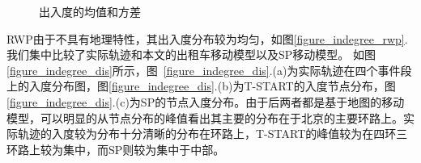 \begin{figure}[!h]
\centering
{}
\caption{出入度的均值和方差}\label{figure_avg}
\end{figure}


RWP由于不具有地理特性，其出入度分布较为均匀，如图\ref{figure_indegree_rwp}. 我们集中比较了实际轨迹和本文的出租车移动模型以及SP移动模型。
如图\ref{figure_indegree_dis}所示，图~\ref{figure_indegree_dis}.(a)为实际轨迹在四个事件段上的入度分布图，图\ref{figure_indegree_dis}.(b)为T-START的入度节点分布，图\ref{figure_indegree_dis}.(c)为SP的节点入度分布。由于后两者都是基于地图的移动模型，可以明显的从节点分布的峰值看出其主要的分布在于北京的主要环路上。实际轨迹的入度较为分布十分清晰的分布在环路上，T-START的峰值较为在四环三环路上较为集中，而SP则较为集中于中部。


